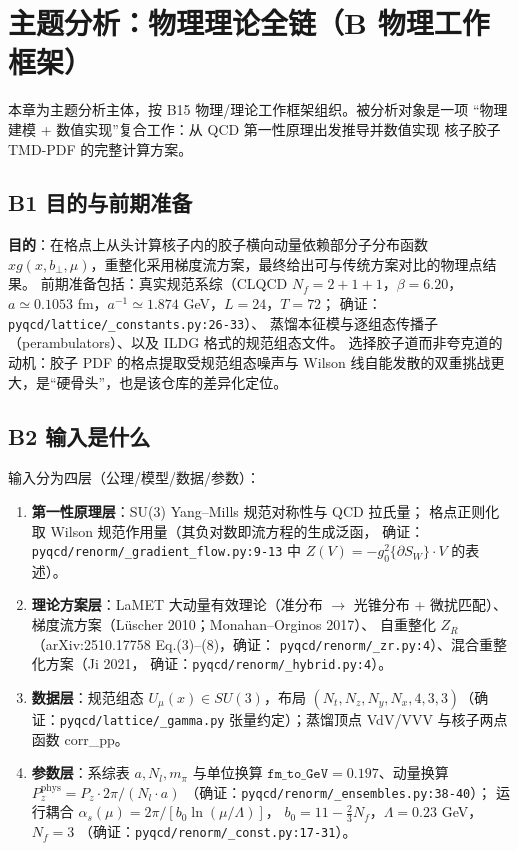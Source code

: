 \documentclass[UTF8]{ctexart}
\begin{document}
\section{主题分析：物理理论全链（B 物理工作框架）}

本章为主题分析主体，按 B15 物理/理论工作框架组织。被分析对象是一项
``物理建模 + 数值实现''复合工作：从 QCD 第一性原理出发推导并数值实现
核子胶子 TMD-PDF 的完整计算方案。

\subsection{B1 目的与前期准备}
\textbf{目的}：在格点上从头计算核子内的胶子横向动量依赖部分子分布函数
$xg(x,b_\perp,\mu)$，重整化采用梯度流方案，最终给出可与传统方案对比的物理点结果。
前期准备包括：真实规范系综（CLQCD $N_f=2+1+1$，$\beta=6.20$，
$a\simeq0.1053$ fm，$a^{-1}\simeq1.874$ GeV，$L=24$，$T=72$；
确证：\texttt{\nolinkurl{pyqcd/lattice/_constants.py:26-33}}）、
蒸馏本征模与逐组态传播子（perambulators）、以及 ILDG 格式的规范组态文件。
选择胶子道而非夸克道的动机：胶子 PDF 的格点提取受规范组态噪声与
Wilson 线自能发散的双重挑战更大，是``硬骨头''，也是该仓库的差异化定位。

\subsection{B2 输入是什么}
输入分为四层（公理/模型/数据/参数）：

\begin{enumerate}
\item \textbf{第一性原理层}：SU(3) Yang--Mills 规范对称性与 QCD 拉氏量；
格点正则化取 Wilson 规范作用量（其负对数即流方程的生成泛函，
确证：\texttt{\nolinkurl{pyqcd/renorm/_gradient_flow.py:9-13}} 中
$Z(V)=-g_0^2\{\partial S_W\}\cdot V$ 的表述）。
\item \textbf{理论方案层}：LaMET 大动量有效理论（准分布 $\to$ 光锥分布 + 微扰匹配）、
梯度流方案（L\"uscher 2010；Monahan--Orginos 2017）、
自重整化 $Z_R$（arXiv:2510.17758 Eq.(3)--(8)，确证：
\texttt{\nolinkurl{pyqcd/renorm/_zr.py:4}}）、混合重整化方案（Ji 2021，
确证：\texttt{\nolinkurl{pyqcd/renorm/_hybrid.py:4}}）。
\item \textbf{数据层}：规范组态 $U_\mu(x)\in SU(3)$，布局
$(N_t,N_z,N_y,N_x,4,3,3)$（确证：\texttt{\nolinkurl{pyqcd/lattice/_gamma.py}}
张量约定）；蒸馏顶点 VdV/VVV 与核子两点函数 corr\_pp。
\item \textbf{参数层}：系综表 $a,N_l,m_\pi$ 与单位换算
$\texttt{fm\_to\_GeV}=0.197$、动量换算
$P_z^{\mathrm{phys}}=P_z\cdot 2\pi/(N_l\cdot a)$
（确证：\texttt{\nolinkurl{pyqcd/renorm/_ensembles.py:38-40}}）；
运行耦合 $\alpha_s(\mu)=2\pi/[b_0\ln(\mu/\Lambda)]$，
$b_0=11-\frac{2}{3}N_f$，$\Lambda=0.23$ GeV，$N_f=3$
（确证：\texttt{\nolinkurl{pyqcd/renorm/_const.py:17-31}}）。
\end{enumerate}
\end{document}
